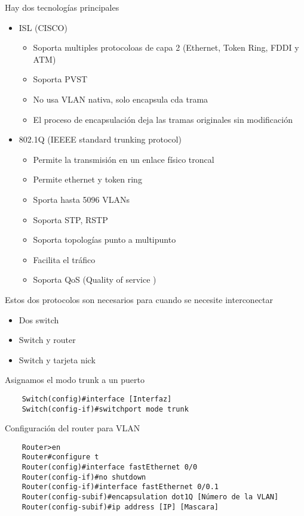 Hay dos tecnologías principales 
\begin{itemize}
    \item {ISL (CISCO)
        \begin{itemize}
            \item Soporta multiples protocoloas de capa 2 (Ethernet, Token Ring, FDDI y ATM)
            \item Soporta PVST 
            \item No usa VLAN nativa, solo encapsula cda trama 
            \item El proceso de encapsulación deja las tramas originales sin modificación
        \end{itemize}}
    \item {802.1Q (IEEEE standard trunking protocol)
        \begin{itemize}
            \item Permite la transmisión en un enlace físico troncal 
            \item Permite ethernet y token ring 
            \item Sporta hasta 5096 VLANs
            \item Soporta STP, RSTP 
            \item Soporta topologías punto a multipunto 
            \item Facilita el tráfico 
            \item Soporta QoS (Quality of service )
        \end{itemize}}
\end{itemize}

Estos dos protocolos son necesarios para cuando se necesite interconectar 
\begin{itemize}
    \item Dos switch 
    \item Switch y router 
    \item Switch y tarjeta nick
\end{itemize}
Asignamos el modo trunk a un puerto
\begin{lstlisting}
    Switch(config)#interface [Interfaz]
    Switch(config-if)#switchport mode trunk    
\end{lstlisting}

Configuración del router para VLAN 
\begin{lstlisting}
    Router>en 
    Router#configure t 
    Router(config)#interface fastEthernet 0/0
    Router(config-if)#no shutdown 
    Router(config-if)#interface fastEthernet 0/0.1 
    Router(config-subif)#encapsulation dot1Q [Número de la VLAN]
    Router(config-subif)#ip address [IP] [Mascara]
\end{lstlisting}

